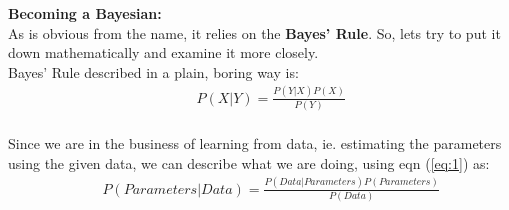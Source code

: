 \documentclass[a4paper]{article}
\begin{document}
%
%
%

\noindent \textbf{Becoming a Bayesian:} \\

\noindent As is obvious from the name, it relies on the \textbf{Bayes' Rule}. So, lets try to put it down mathematically and examine it more closely. \\

\noindent Bayes' Rule described in a plain, boring way is:
\begin{equation} \label{eq:1}
\begin{aligned}
& & P (X|Y) = \frac{ P(Y|X) P(X)}{P(Y)}\\
\end{aligned}
\end{equation}

\noindent Since we are in the business of learning from data, ie. estimating the parameters using the given data, we can describe what we are doing, using eqn (\ref{eq:1}) as:
\begin{equation} \label{eq:2}
\begin{aligned}
& & P (Parameters|Data) = \frac{ P(Data|Parameters) P(Parameters)}{P(Data)}\\
\end{aligned}
\end{equation}
\end{document}
